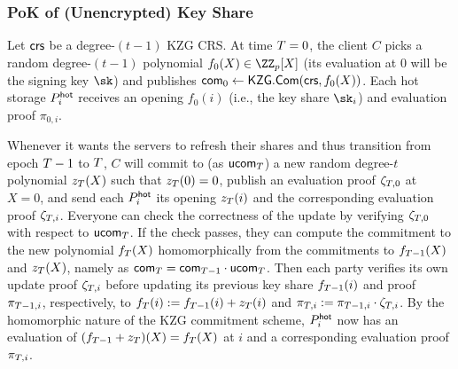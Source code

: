\subsubsection{PoK of (Unencrypted) Key Share}\label{subsec:unenc_pok}

Let $\mathsf{crs}$ be a degree-$(t-1)$ KZG CRS. At time $T=0$, the client $C$ picks a random degree-$(t-1)$ polynomial $f_0(X) \in \ZZ_p[X]$ (its evaluation at 0 will be the signing key $\sk$) and publishes $\mathsf{com}_0 \gets \mathsf{KZG}.\mathsf{Com}(\mathsf{crs}, f_0(X))$. 
Each hot storage $P_i^{\mathsf{hot}}$ receives an opening $f_0(i)$ (i.e., the key share $\sk_i$) and evaluation proof $\pi_{0,i}$. 

Whenever it wants the servers to refresh their shares and thus transition from epoch $T-1$ to $T$, $C$ will commit to (as $\mathsf{ucom}_{T}$) a new random degree-$t$ polynomial $z_{T}(X)$ such that $z_{T}(0) = 0$, publish an evaluation proof $\zeta_{T,0}$ at $X=0$, and send each $P_i^{\mathsf{hot}}$ its opening $z_{T}(i)$ and the corresponding evaluation proof $\zeta_{T,i}$. Everyone can check the correctness of the update by verifying $\zeta_{T,0}$ with respect to $\mathsf{ucom}_{T}$. If the check passes, they can compute the commitment to the new polynomial $f_{T}(X)$ homomorphically from the commitments to $f_{T-1}(X)$ and $z_{T}(X)$, namely as $\mathsf{com}_{T} = \mathsf{com}_{T-1} \cdot \mathsf{ucom}_{T}$.
Then each party verifies its own update proof $\zeta_{T,i}$ before updating its previous key share $f_{T-1}(i)$ and proof $\pi_{T-1,i}$, respectively, to $f_{T}(i) := f_{T-1}(i) + z_{T}(i)$ and $\pi_{T,i} := \pi_{T-1,i} \cdot \zeta_{T,i}$. By the homomorphic nature of the KZG commitment scheme, $P_i^{\mathsf{hot}}$ now has an evaluation of $(f_{T-1} + z_{T})(X) = f_{T}(X)$ at $i$ and a corresponding evaluation proof $\pi_{T,i}$. 

